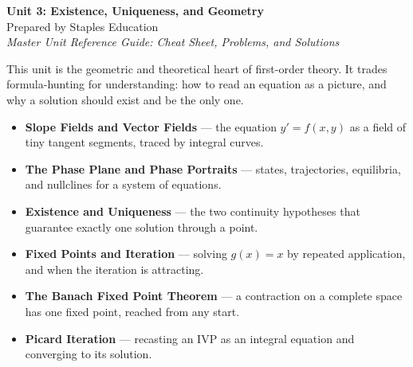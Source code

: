 




\begin{center}
    {\LARGE \bfseries Unit 3: Existence, Uniqueness, and Geometry}\\[6pt]
    {\large Prepared by Staples Education}\\[4pt]
    {\itshape Master Unit Reference Guide: Cheat Sheet, Problems, and Solutions}
\end{center}

\vspace{0.4em}

\tableofcontents

\vspace{0.4em}

\begin{topicsbox}
This unit is the geometric and theoretical heart of first-order theory. It
trades formula-hunting for understanding: how to read an equation as a picture,
and why a solution should exist and be the only one.
\begin{itemize}[leftmargin=1.4em, itemsep=3pt]
    \item \textbf{Slope Fields and Vector Fields} --- the equation
          $y' = f(x,y)$ as a field of tiny tangent segments, traced by integral
          curves.
    \item \textbf{The Phase Plane and Phase Portraits} --- states, trajectories,
          equilibria, and nullclines for a system of equations.
    \item \textbf{Existence and Uniqueness} --- the two continuity hypotheses
          that guarantee exactly one solution through a point.
    \item \textbf{Fixed Points and Iteration} --- solving $g(x)=x$ by repeated
          application, and when the iteration is attracting.
    \item \textbf{The Banach Fixed Point Theorem} --- a contraction on a
          complete space has one fixed point, reached from any start.
    \item \textbf{Picard Iteration} --- recasting an IVP as an integral
          equation and converging to its solution.
\end{itemize}
\end{topicsbox}

